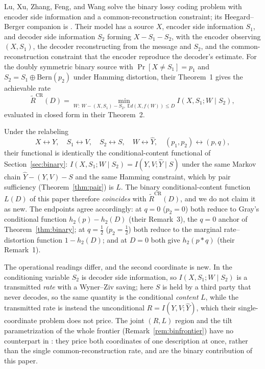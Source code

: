 ﻿\documentclass[11pt,onecolumn]{IEEEtran}
\newcommand{\E}{\mathbb{E}}
\newcommand{\hY}{\widehat{Y}}
\begin{document}
Lu, Xu, Zhang, Feng, and Wang \cite{lu2016lossy} solve the binary lossy coding
problem with encoder side information and a common-reconstruction constraint;
its Heegard--Berger companion is \cite{lu2016binary}. Their model has a source
$X$, encoder side information $S_1$, and decoder side information $S_2$ forming
$X-S_1-S_2$, with the encoder observing $(X,S_1)$, the decoder reconstructing
from the message and $S_2$, and the common-reconstruction constraint that the
encoder reproduce the decoder's estimate. For the doubly symmetric binary source
with $\Pr[X\ne S_1]=p_1$ and $S_2=S_1\oplus\mathrm{Bern}(p_2)$ under Hamming
distortion, their Theorem~1 gives the achievable rate
\[
  \widetilde R^{\mathrm{CR}}(D)
  =\min_{W:\ W-(X,S_1)-S_2,\ \E d(X,f(W))\le D} I(X,S_1;W\mid S_2),
\]
evaluated in closed form in their Theorem~2.

Under the relabeling
\[
  X\leftrightarrow Y,\quad S_1\leftrightarrow V,\quad S_2\leftrightarrow S,\quad
  W\leftrightarrow\hY,\quad (p_1,p_2)\leftrightarrow(p,q),
\]
their functional is identically the conditional-content functional of
Section~\ref{sec:binary}: $I(X,S_1;W\mid S_2)=I(Y,V;\hY\mid S)$ under the same
Markov chain $\hY-(Y,V)-S$ and the same Hamming constraint, which by pair
sufficiency (Theorem~\ref{thm:pair}) is $L$. The binary conditional-content
function $L(D)$ of this paper therefore \emph{coincides} with
$\widetilde R^{\mathrm{CR}}(D)$, and we do not claim it as new. The endpoints
agree accordingly: at $q=0$ ($p_2=0$) both reduce to Gray's conditional function
$h_2(p)-h_2(D)$ (their Remark~3), the $q=0$ anchor of Theorem~\ref{thm:binary}; at
$q=\tfrac12$ ($p_2=\tfrac12$) both reduce to the marginal rate--distortion
function $1-h_2(D)$; and at $D=0$ both give $h_2(p*q)$ (their Remark~1).

The operational readings differ, and the second coordinate is new. In
\cite{lu2016lossy} the conditioning variable $S_2$ is decoder side information,
so $I(X,S_1;W\mid S_2)$ is a transmitted \emph{rate} with a Wyner--Ziv saving;
here $S$ is held by a third party that never decodes, so the same quantity is
the conditional \emph{content} $L$, while the transmitted rate is instead the
unconditional $R=I(Y,V;\hY)$, which their single-coordinate problem does not
price. The joint $(R,L)$ region and the tilt parametrization of the whole
frontier (Remark~\ref{rem:binfrontier}) have no counterpart in
\cite{lu2016lossy}: they price both coordinates of one description at once,
rather than the single common-reconstruction rate, and are the binary
contribution of this paper.
\end{document}

